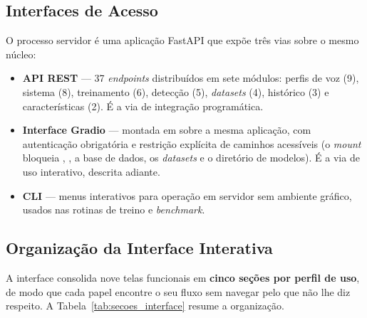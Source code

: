 \documentclass[12pt,a4paper]{article}
\begin{document}
\subsection{Interfaces de Acesso}

O processo servidor é uma aplicação FastAPI que expõe três vias sobre o mesmo
núcleo:

\begin{itemize}
	\item \textbf{API REST} --- \num{37} \textit{endpoints} distribuídos em
	sete módulos: perfis de voz (\num{9}), sistema (\num{8}), treinamento
	(\num{6}), detecção (\num{5}), \textit{datasets} (\num{4}), histórico
	(\num{3}) e características (\num{2}). É a via de integração programática.
	\item \textbf{Interface Gradio} --- montada em  sobre a mesma
	aplicação, com autenticação obrigatória e restrição explícita de caminhos
	acessíveis (o \textit{mount} bloqueia , , a base de
	dados, os \textit{datasets} e o diretório de modelos). É a via de uso
	interativo, descrita adiante.
	\item \textbf{CLI} --- menus interativos para operação em servidor sem
	ambiente gráfico, usados nas rotinas de treino e \textit{benchmark}.
\end{itemize}

\subsection{Organização da Interface Interativa}

A interface consolida nove telas funcionais em \textbf{cinco seções por perfil
	de uso}, de modo que cada papel encontre o seu fluxo sem navegar pelo que não
lhe diz respeito. A Tabela~\ref{tab:secoes_interface} resume a organização.
\end{document}
